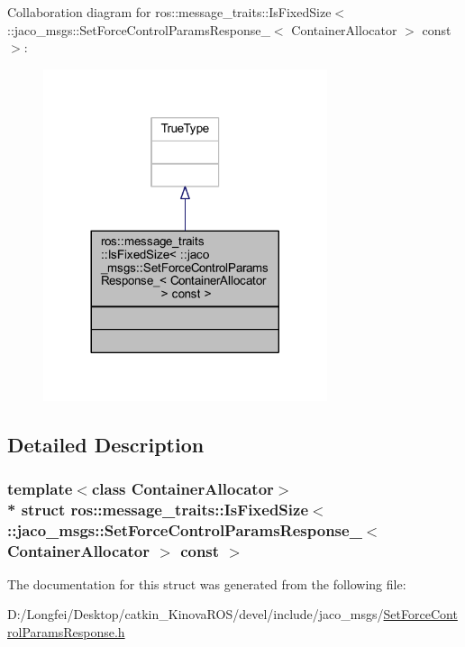 Collaboration diagram for ros\+:\+:message\+\_\+traits\+:\+:Is\+Fixed\+Size$<$ \+:\+:jaco\+\_\+msgs\+:\+:Set\+Force\+Control\+Params\+Response\+\_\+$<$ Container\+Allocator $>$ const $>$\+:
\nopagebreak
\begin{figure}[H]
\begin{center}
\leavevmode
\includegraphics[width=236pt]{dd/d44/structros_1_1message__traits_1_1IsFixedSize_3_01_1_1jaco__msgs_1_1SetForceControlParamsResponse_d682764faf03689241ac2aa718a32d6f}
\end{center}
\end{figure}


\subsection{Detailed Description}
\subsubsection*{template$<$class Container\+Allocator$>$\\*
struct ros\+::message\+\_\+traits\+::\+Is\+Fixed\+Size$<$ \+::jaco\+\_\+msgs\+::\+Set\+Force\+Control\+Params\+Response\+\_\+$<$ Container\+Allocator $>$ const  $>$}



The documentation for this struct was generated from the following file\+:\begin{DoxyCompactItemize}
\item 
D\+:/\+Longfei/\+Desktop/catkin\+\_\+\+Kinova\+R\+O\+S/devel/include/jaco\+\_\+msgs/\hyperlink{SetForceControlParamsResponse_8h}{Set\+Force\+Control\+Params\+Response.\+h}\end{DoxyCompactItemize}
